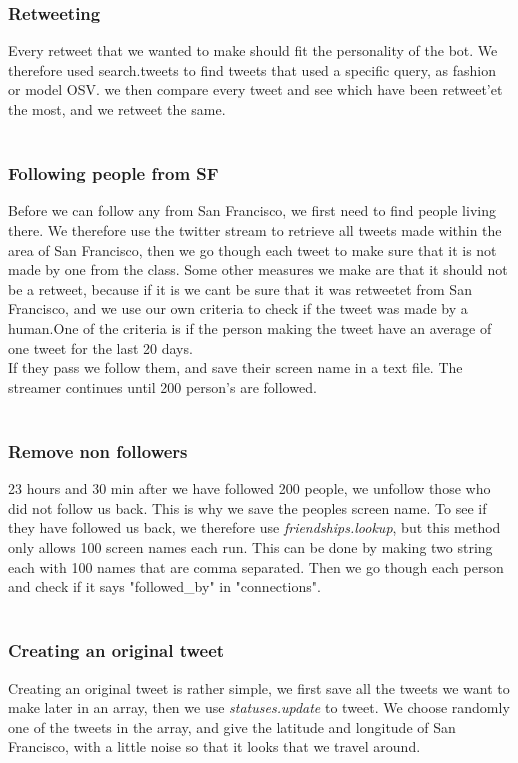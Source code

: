 \subsubsection{Retweeting}
Every retweet that we wanted to make should fit the personality of the bot. We therefore used search.tweets to find tweets that used a specific query, as fashion or model OSV. we then compare every tweet and see which have been retweet'et the most, and we retweet the same.\\
\\

\subsubsection{Following people from SF}
Before we can follow any from San Francisco, we first need to find people living there. We therefore use the twitter stream to retrieve all tweets made within the area of San Francisco, then we go though each tweet to make sure that it is not made by one from the class. Some other measures we make are that it should not be a retweet, because if it is we cant be sure that it was retweetet from San Francisco, and we use our own criteria to check if the tweet was made by a human.One of the criteria is if the person making the tweet have an average of one tweet for the last 20 days.\\ 
If they pass we follow them, and save their screen name in a text file. The streamer continues until 200 person's are followed.\\
\\

\subsubsection{Remove non followers}
23 hours and 30 min after we have followed 200 people, we unfollow those who did not follow us back. This is why we save the peoples screen name. To see if they have followed us back, we therefore use \textit{friendships.lookup}, but this method only allows 100 screen names each run. This can be done by making two string each with 100 names that are comma separated. Then we go though each person and check if it says "followed\_by" in "connections".\\
\\

\subsubsection{Creating an original tweet}
Creating an original tweet is rather simple, we first save all the tweets we want to make later in an array, then we use \textit{statuses.update} to tweet. We choose randomly one of the tweets in the array, and give the latitude and longitude of San Francisco, with a little noise so that it looks that we travel around.\\
\\

